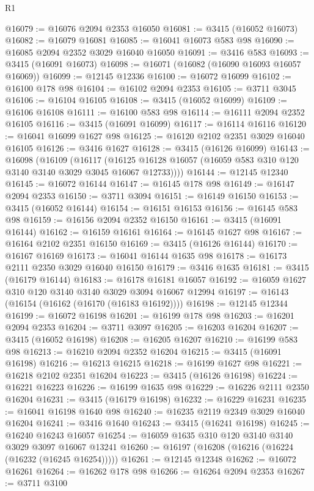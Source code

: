 \begin{lexlean}{R1}
\begin{coremodule}
@16079 := @16076 @2094 @2353 @16050
@16081 := @3415 (@16052 @16073)
@16082 := @16079 @16081
@16085 := @16041 @16073 @583 @98
@16090 := @16085 @2094 @2352 @3029 @16040 @16050
@16091 := @3416 @583
@16093 := @3415 (@16091 @16073)
@16098 := @16071 (@16082 (@16090 @16093 @16057 @16069))
@16099 := @12145 @12336
@16100 := @16072 @16099
@16102 := @16100 @178 @98
@16104 := @16102 @2094 @2353
@16105 := @3711 @3045
@16106 := @16104 @16105
@16108 := @3415 (@16052 @16099)
@16109 := @16106 @16108
@16111 := @16100 @583 @98
@16114 := @16111 @2094 @2352 @16105
@16116 := @3415 (@16091 @16099)
@16117 := @16114 @16116
@16120 := @16041 @16099 @1627 @98
@16125 := @16120 @2102 @2351 @3029 @16040 @16105
@16126 := @3416 @1627
@16128 := @3415 (@16126 @16099)
@16143 := @16098
    (@16109
      (@16117 (@16125 @16128 @16057 (@16059 @583 @310 @120 @3140 @3140 @3029 @3045 @16067 @12733))))
@16144 := @12145 @12340
@16145 := @16072 @16144
@16147 := @16145 @178 @98
@16149 := @16147 @2094 @2353
@16150 := @3711 @3094
@16151 := @16149 @16150
@16153 := @3415 (@16052 @16144)
@16154 := @16151 @16153
@16156 := @16145 @583 @98
@16159 := @16156 @2094 @2352 @16150
@16161 := @3415 (@16091 @16144)
@16162 := @16159 @16161
@16164 := @16145 @1627 @98
@16167 := @16164 @2102 @2351 @16150
@16169 := @3415 (@16126 @16144)
@16170 := @16167 @16169
@16173 := @16041 @16144 @1635 @98
@16178 := @16173 @2111 @2350 @3029 @16040 @16150
@16179 := @3416 @1635
@16181 := @3415 (@16179 @16144)
@16183 := @16178 @16181 @16057
@16192 := @16059 @1627 @310 @120 @3140 @3140 @3029 @3094 @16067 @12994
@16197 := @16143 (@16154 (@16162 (@16170 (@16183 @16192))))
@16198 := @12145 @12344
@16199 := @16072 @16198
@16201 := @16199 @178 @98
@16203 := @16201 @2094 @2353
@16204 := @3711 @3097
@16205 := @16203 @16204
@16207 := @3415 (@16052 @16198)
@16208 := @16205 @16207
@16210 := @16199 @583 @98
@16213 := @16210 @2094 @2352 @16204
@16215 := @3415 (@16091 @16198)
@16216 := @16213 @16215
@16218 := @16199 @1627 @98
@16221 := @16218 @2102 @2351 @16204
@16223 := @3415 (@16126 @16198)
@16224 := @16221 @16223
@16226 := @16199 @1635 @98
@16229 := @16226 @2111 @2350 @16204
@16231 := @3415 (@16179 @16198)
@16232 := @16229 @16231
@16235 := @16041 @16198 @1640 @98
@16240 := @16235 @2119 @2349 @3029 @16040 @16204
@16241 := @3416 @1640
@16243 := @3415 (@16241 @16198)
@16245 := @16240 @16243 @16057
@16254 := @16059 @1635 @310 @120 @3140 @3140 @3029 @3097 @16067 @13241
@16260 := @16197 (@16208 (@16216 (@16224 (@16232 (@16245 @16254)))))
@16261 := @12145 @12348
@16262 := @16072 @16261
@16264 := @16262 @178 @98
@16266 := @16264 @2094 @2353
@16267 := @3711 @3100

\end{coremodule}
\end{lexlean}
